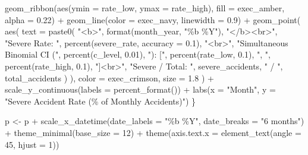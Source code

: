 \documentclass[
  letterpaper,
  DIV=11,
  numbers=noendperiod]{scrartcl}
\newenvironment{Shaded}{\begin{snugshade}}{\end{snugshade}}
\newcommand{\AttributeTok}[1]{\textcolor[rgb]{0.40,0.45,0.13}{#1}}
\newcommand{\DecValTok}[1]{\textcolor[rgb]{0.68,0.00,0.00}{#1}}
\newcommand{\FloatTok}[1]{\textcolor[rgb]{0.68,0.00,0.00}{#1}}
\newcommand{\FunctionTok}[1]{\textcolor[rgb]{0.28,0.35,0.67}{#1}}
\newcommand{\NormalTok}[1]{\textcolor[rgb]{0.00,0.23,0.31}{#1}}
\newcommand{\OtherTok}[1]{\textcolor[rgb]{0.00,0.23,0.31}{#1}}
\newcommand{\SpecialCharTok}[1]{\textcolor[rgb]{0.37,0.37,0.37}{#1}}
\newcommand{\StringTok}[1]{\textcolor[rgb]{0.13,0.47,0.30}{#1}}
\begin{document}
\begin{Shaded}
\begin{Highlighting}[]
        \FunctionTok{geom\_ribbon}\NormalTok{(}\FunctionTok{aes}\NormalTok{(}\AttributeTok{ymin =}\NormalTok{ rate\_low, }\AttributeTok{ymax =}\NormalTok{ rate\_high), }\AttributeTok{fill =}\NormalTok{ exec\_amber, }\AttributeTok{alpha =} \FloatTok{0.22}\NormalTok{) }\SpecialCharTok{+}
        \FunctionTok{geom\_line}\NormalTok{(}\AttributeTok{color =}\NormalTok{ exec\_navy, }\AttributeTok{linewidth =} \FloatTok{0.9}\NormalTok{) }\SpecialCharTok{+}
        \FunctionTok{geom\_point}\NormalTok{(}
          \FunctionTok{aes}\NormalTok{(}
            \AttributeTok{text =} \FunctionTok{paste0}\NormalTok{(}
              \StringTok{"\textless{}b\textgreater{}"}\NormalTok{, }\FunctionTok{format}\NormalTok{(month\_year, }\StringTok{"\%b \%Y"}\NormalTok{), }\StringTok{"\textless{}/b\textgreater{}\textless{}br\textgreater{}"}\NormalTok{,}
              \StringTok{"Severe Rate: "}\NormalTok{, }\FunctionTok{percent}\NormalTok{(severe\_rate, }\AttributeTok{accuracy =} \FloatTok{0.1}\NormalTok{), }\StringTok{"\textless{}br\textgreater{}"}\NormalTok{,}
              \StringTok{"Simultaneous Binomial CI ("}\NormalTok{, }\FunctionTok{percent}\NormalTok{(c\_level, }\FloatTok{0.01}\NormalTok{), }\StringTok{"): ["}\NormalTok{,}
              \FunctionTok{percent}\NormalTok{(rate\_low, }\FloatTok{0.1}\NormalTok{), }\StringTok{", "}\NormalTok{, }\FunctionTok{percent}\NormalTok{(rate\_high, }\FloatTok{0.1}\NormalTok{), }\StringTok{"]\textless{}br\textgreater{}"}\NormalTok{,}
              \StringTok{"Severe / Total: "}\NormalTok{, severe\_accidents, }\StringTok{" / "}\NormalTok{, total\_accidents}
\NormalTok{            )}
\NormalTok{          ),}
          \AttributeTok{color =}\NormalTok{ exec\_crimson, }\AttributeTok{size =} \FloatTok{1.8}
\NormalTok{        ) }\SpecialCharTok{+}
        \FunctionTok{scale\_y\_continuous}\NormalTok{(}\AttributeTok{labels =} \FunctionTok{percent\_format}\NormalTok{()) }\SpecialCharTok{+}
        \FunctionTok{labs}\NormalTok{(}\AttributeTok{x =} \StringTok{"Month"}\NormalTok{, }\AttributeTok{y =} \StringTok{"Severe Accident Rate (\% of Monthly Accidents)"}\NormalTok{)}
\NormalTok{    \}}

\NormalTok{    p }\OtherTok{\textless{}{-}}\NormalTok{ p }\SpecialCharTok{+}
      \FunctionTok{scale\_x\_datetime}\NormalTok{(}\AttributeTok{date\_labels =} \StringTok{"\%b \%Y"}\NormalTok{, }\AttributeTok{date\_breaks =} \StringTok{"6 months"}\NormalTok{) }\SpecialCharTok{+}
      \FunctionTok{theme\_minimal}\NormalTok{(}\AttributeTok{base\_size =} \DecValTok{12}\NormalTok{) }\SpecialCharTok{+}
      \FunctionTok{theme}\NormalTok{(}\AttributeTok{axis.text.x =} \FunctionTok{element\_text}\NormalTok{(}\AttributeTok{angle =} \DecValTok{45}\NormalTok{, }\AttributeTok{hjust =} \DecValTok{1}\NormalTok{))}


\end{Highlighting}
\end{Shaded}
\end{document}
